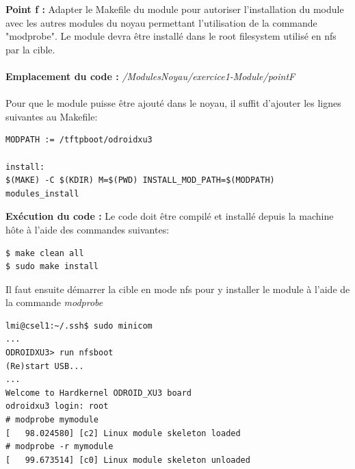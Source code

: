 \textbf{Point f :} Adapter	le	Makefile	du	module	pour	autoriser	l’installation	du	module	avec	les	autres	modules	du	noyau	permettant	l’utilisation	de	la	commande	"modprobe".	Le	module	devra	être	installé	dans	le	root	filesystem	utilisé	en	nfs	par	la	cible.\\\\
\textbf{Emplacement du code : } \textit{/ModulesNoyau/exercice1-Module/pointF}\\\\
Pour que le module puisse être ajouté dans le noyau, il suffit d'ajouter les lignes suivantes au Makefile:
\begin{lstlisting}
MODPATH := /tftpboot/odroidxu3

install:
$(MAKE) -C $(KDIR) M=$(PWD) INSTALL_MOD_PATH=$(MODPATH) modules_install
\end{lstlisting}
\textbf{Exécution du code : }Le code doit être compilé et installé depuis la machine hôte à l'aide des commandes suivantes:
\begin{lstlisting}
$ make clean all
$ sudo make install
\end{lstlisting}
Il faut ensuite démarrer la cible en mode nfs pour y installer le module à l'aide de la commande \textit{modprobe}
\begin{lstlisting}
lmi@csel1:~/.ssh$ sudo minicom
...
ODROIDXU3> run nfsboot
(Re)start USB...
...
Welcome to Hardkernel ODROID_XU3 board                                          
odroidxu3 login: root  
# modprobe mymodule                                                             
[   98.024580] [c2] Linux module skeleton loaded                                
# modprobe -r mymodule                                                          
[   99.673514] [c0] Linux module skeleton unloaded   
\end{lstlisting}
